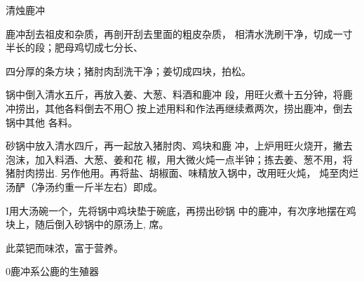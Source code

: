 \begin{recipe}{清烛鹿冲}

\ingredients



\cooking

\step 鹿冲刮去祖皮和杂质，再剖开刮去里面的粗皮杂质， 相清水洗刷干净，切成一寸半长的段；肥母鸡切成七分长、

四分厚的条方块；猪肘肉刮洗干净；姜切成四块，拍松。

\step 	锅中倒入清水五斤，再放入姜、大葱、料酒和鹿冲 段，用旺火煮十五分钟，将鹿冲捞出，其他各料倒去不用〇 按上述用料和作法再继续煮两次，捞出鹿冲，倒去锅中其他 各料。

\step 	砂锅中放入清水四斤，再一起放入猪肘肉、鸡块和鹿 冲，上炉用旺火烧开，撇去泡沫，加入料酒、大葱、姜和花 椒，用大微火炖一点半钟；拣去姜、葱不用，将猪肘肉捞出. 另作他用。再将盐、胡椒面、味精放入锅中，改用旺火炖， 炖至肉烂汤酽（净汤约重一斤半左右）即成。

I用大汤碗一个，先将锅中鸡块垫于碗底，再捞出砂锅 中的鹿冲，有次序地摆在鸡块上，随后倒入砂锅中的原汤上, 席。

\notes

此菜钯而味浓，富于营养。

0鹿冲系公鹿的生殖器

\end{recipe}

